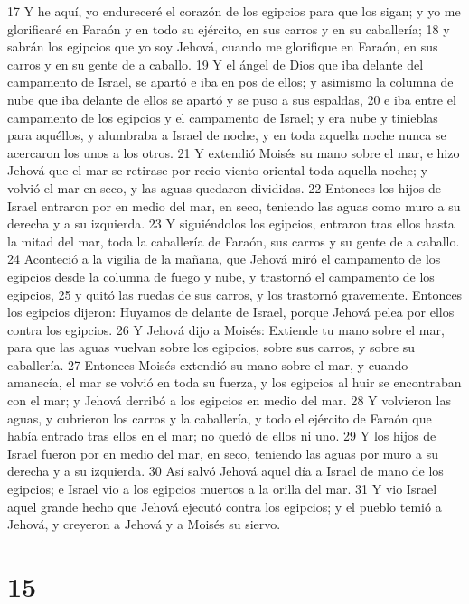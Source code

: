 17 Y he aquí, yo endureceré el corazón de los egipcios para que los sigan; y yo me glorificaré en Faraón y en todo su ejército, en sus carros y en su caballería;
18 y sabrán los egipcios que yo soy Jehová, cuando me glorifique en Faraón, en sus carros y en su gente de a caballo.
19 Y el ángel de Dios que iba delante del campamento de Israel, se apartó e iba en pos de ellos; y asimismo la columna de nube que iba delante de ellos se apartó y se puso a sus espaldas,
20 e iba entre el campamento de los egipcios y el campamento de Israel; y era nube y tinieblas para aquéllos, y alumbraba a Israel de noche, y en toda aquella noche nunca se acercaron los unos a los otros.
21 Y extendió Moisés su mano sobre el mar, e hizo Jehová que el mar se retirase por recio viento oriental toda aquella noche; y volvió el mar en seco, y las aguas quedaron divididas.
22 Entonces los hijos de Israel entraron por en medio del mar, en seco, teniendo las aguas como muro a su derecha y a su izquierda.
23 Y siguiéndolos los egipcios, entraron tras ellos hasta la mitad del mar, toda la caballería de Faraón, sus carros y su gente de a caballo.
24 Aconteció a la vigilia de la mañana, que Jehová miró el campamento de los egipcios desde la columna de fuego y nube, y trastornó el campamento de los egipcios,
25 y quitó las ruedas de sus carros, y los trastornó gravemente. Entonces los egipcios dijeron: Huyamos de delante de Israel, porque Jehová pelea por ellos contra los egipcios.
26 Y Jehová dijo a Moisés: Extiende tu mano sobre el mar, para que las aguas vuelvan sobre los egipcios, sobre sus carros, y sobre su caballería.
27 Entonces Moisés extendió su mano sobre el mar, y cuando amanecía, el mar se volvió en toda su fuerza, y los egipcios al huir se encontraban con el mar; y Jehová derribó a los egipcios en medio del mar.
28 Y volvieron las aguas, y cubrieron los carros y la caballería, y todo el ejército de Faraón que había entrado tras ellos en el mar; no quedó de ellos ni uno.
29 Y los hijos de Israel fueron por en medio del mar, en seco, teniendo las aguas por muro a su derecha y a su izquierda.
30 Así salvó Jehová aquel día a Israel de mano de los egipcios; e Israel vio a los egipcios muertos a la orilla del mar.
31 Y vio Israel aquel grande hecho que Jehová ejecutó contra los egipcios; y el pueblo temió a Jehová, y creyeron a Jehová y a Moisés su siervo.

\chapter{15}

